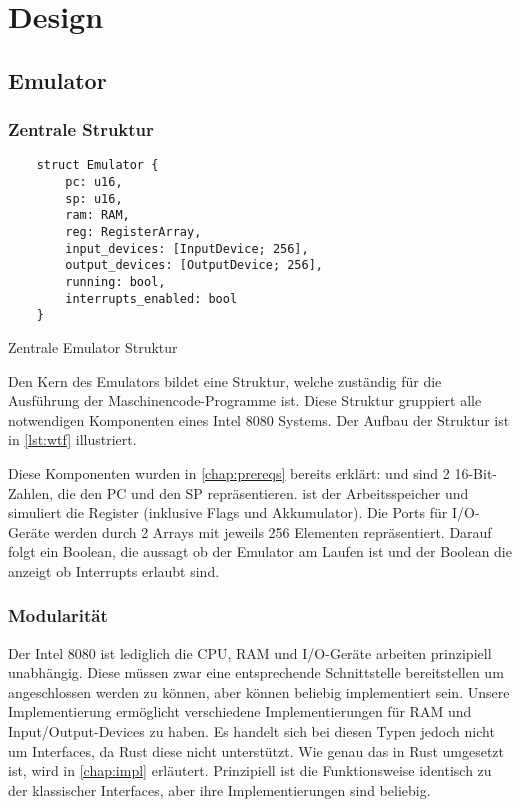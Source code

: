 \chapter{Design}\label{chap:design}

\section{Emulator}

\subsection{Zentrale Struktur}

\begin{listing}[ht]
\begin{verbatim}
    struct Emulator {
        pc: u16,
        sp: u16,
        ram: RAM,
        reg: RegisterArray,
        input_devices: [InputDevice; 256],
        output_devices: [OutputDevice; 256],
        running: bool,
        interrupts_enabled: bool
    }
\end{verbatim}
\centering
\caption{Zentrale Emulator Struktur}
\label{lst:wtf}
\end{listing}

Den Kern des Emulators bildet eine Struktur, welche zuständig für die Ausführung der Maschinencode-Programme ist. Diese Struktur gruppiert alle notwendigen Komponenten eines Intel 8080 Systems. Der Aufbau der Struktur ist in \cref{lst:wtf} illustriert.

Diese Komponenten wurden in \cref{chap:prereqs} bereits erklärt:  und  sind 2 16-Bit-Zahlen, die den \ac{PC} und den \ac{SP} repräsentieren.  ist der Arbeitsspeicher und  simuliert die Register (inklusive Flags und Akkumulator).
Die Ports für I/O-Geräte werden durch 2 Arrays mit jeweils 256 Elementen repräsentiert.
Darauf folgt ein Boolean, die aussagt ob der Emulator am Laufen ist und der Boolean die anzeigt ob Interrupts erlaubt sind.


\subsection{Modularität}

Der Intel 8080 ist lediglich die CPU, RAM und I/O-Geräte arbeiten prinzipiell unabhängig. Diese müssen zwar eine entsprechende Schnittstelle bereitstellen um angeschlossen werden zu können, aber können beliebig implementiert sein. Unsere Implementierung ermöglicht verschiedene Implementierungen für RAM und Input/Output-Devices zu haben. Es handelt sich bei diesen Typen jedoch nicht um Interfaces, da Rust diese nicht unterstützt. Wie genau das in Rust umgesetzt ist, wird in \cref{chap:impl} erläutert. Prinzipiell ist die Funktionsweise identisch zu der klassischer Interfaces, aber ihre Implementierungen sind beliebig.

